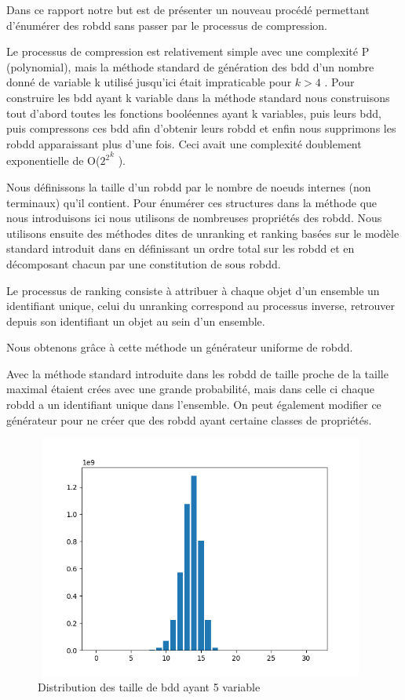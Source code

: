 \documentclass[french]{article}
\begin{document}
Dans ce rapport notre but est de présenter un nouveau procédé permettant d'énumérer des robdd sans passer par le processus de compression.\medskip

Le processus de compression est relativement simple avec une complexité P (polynomial), mais la méthode standard de génération des bdd d'un nombre donné de variable k utilisé jusqu'ici était impraticable pour {\(k > 4\)} \cite{newton}. Pour construire les bdd ayant k variable dans la méthode standard nous construisons tout d'abord toutes les fonctions booléennes ayant k variables, puis leurs bdd, puis compressons ces bdd afin d'obtenir leurs robdd et enfin nous supprimons les robdd apparaissant plus d'une fois. Ceci avait une complexité doublement exponentielle de  O(\( {2^2}^k\) ).\medskip

Nous définissons la taille d'un robdd par le nombre de noeuds internes (non terminaux) qu'il contient.
\newpage
Pour énumérer ces structures dans la méthode que nous introduisons ici nous utilisons de nombreuses propriétés des robdd.  Nous utilisons ensuite des méthodes dites de unranking et ranking basées sur le modèle standard introduit dans \cite{wilf} en définissant un ordre total sur les robdd et en décomposant chacun par une constitution de sous robdd.

Le processus de ranking consiste à attribuer à chaque objet d'un ensemble un identifiant unique, celui du unranking correspond au processus inverse, retrouver depuis son identifiant un objet au sein d'un ensemble.\medskip

Nous obtenons grâce à cette méthode un générateur uniforme de robdd.\medskip

Avec la méthode standard introduite dans \cite{newton} les robdd de taille proche de la taille maximal étaient crées avec une grande probabilité, mais dans celle ci chaque robdd a un identifiant unique dans l'ensemble. On peut également modifier ce générateur pour ne créer que des robdd ayant certaine classes de propriétés.

\begin{figure}[htp]
    \centering
    \includegraphics[width=11cm, height=8cm]{index5}
    \caption{Distribution des taille de bdd ayant 5 variable}
    \label{fig:Figure1.2}
\end{figure}
\end{document}
